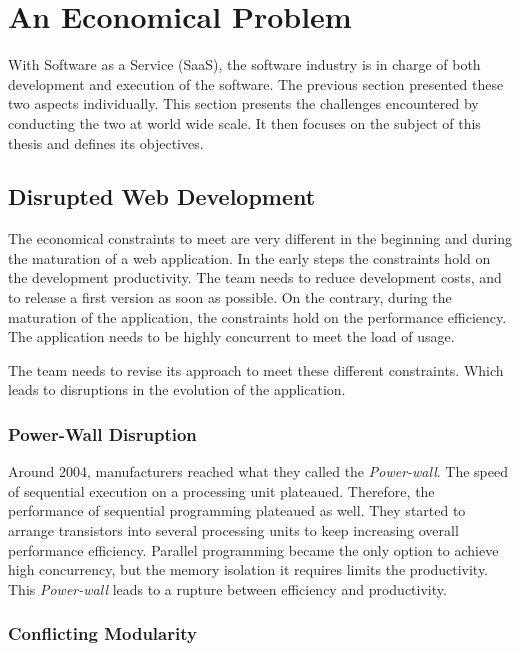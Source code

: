 \section{An Economical Problem} \label{chapter2:problem-statement}

With Software as a Service (SaaS), the software industry is in charge of both development and execution of the software.
The previous section presented these two aspects individually.
This section presents the challenges encountered by conducting the two at world wide scale.
It then focuses on the subject of this thesis and defines its objectives.

\subsection{Disrupted Web Development}

The economical constraints to meet are very different in the beginning and during the maturation of a web application.
In the early steps the constraints hold on the development productivity.
The team needs to reduce development costs, and to release a first version as soon as possible.
On the contrary, during the maturation of the application, the constraints hold on the performance efficiency.
The application needs to be highly concurrent to meet the load of usage.

The team needs to revise its approach to meet these different constraints.
Which leads to disruptions in the evolution of the application.

\subsubsection{Power-Wall Disruption}

Around 2004, manufacturers reached what they called the \textit{Power-wall}.
The speed of sequential execution on a processing unit plateaued.
Therefore, the performance of sequential programming plateaued as well.
They started to arrange transistors into several processing units to keep increasing overall performance efficiency.
Parallel programming became the only option to achieve high concurrency, but the memory isolation it requires limits the productivity.
This \textit{Power-wall} leads to a rupture between efficiency and productivity.

\subsubsection{Conflicting Modularity}

